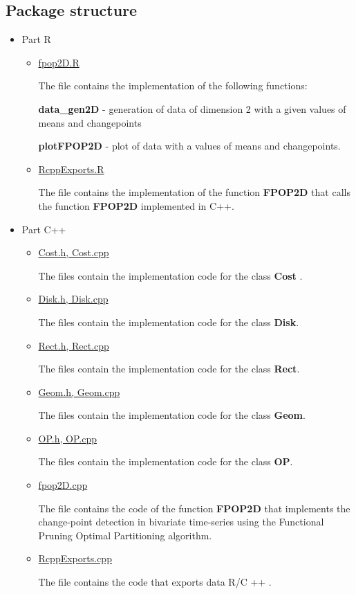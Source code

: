 \documentclass{report}
\begin{document}
	\subsection*{Package structure}
	\begin{itemize}
		\item  Part R
		\begin{itemize}
			\item \underline {fpop2D.R}
			
			The file contains the implementation of the following functions:
			
			 {\bfseries data\_gen2D} - generation of data of dimension 2 with a given values of means and changepoints
			 
			 {\bfseries plotFPOP2D} - plot of data with a  values of means and changepoints.
			 
			\item \underline {RcppExports.R} 
			
			The file contains the implementation of the function {\bfseries FPOP2D} that calls the function {\bfseries FPOP2D} implemented in C++.
			
		\end{itemize}
		\item Part C++
		\begin{itemize}
			\item \underline{Cost.h, Cost.cpp}
			
			The files contain the implementation code for the class {\bfseries Cost} . 
				
			
			\item \underline{Disk.h, Disk.cpp}
			
			The files contain the implementation code for the class {\bfseries Disk}. 
			
			\item  \underline{Rect.h, Rect.cpp}
			
			The files contain the implementation code for the class {\bfseries Rect}.
			 
			\item \underline{Geom.h, Geom.cpp} 
			
			The files contain the implementation code for the class {\bfseries Geom}. 
			
			\item \underline{OP.h, OP.cpp}
			
			The files contain the implementation code for the class {\bfseries OP}. 
			
			\item \underline{fpop2D.cpp}
			
			The file contains the code of the function {\bfseries FPOP2D} that implements the change-point detection in bivariate time-series using the Functional Pruning Optimal Partitioning algorithm.
			
			\item \underline{RcppExports.cpp} 
			
			The file contains the code that exports data R/C ++ .
				
		\end{itemize}
	\end{itemize}
\end{document}
